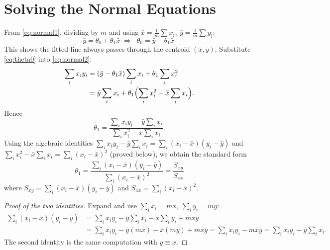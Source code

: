 \documentclass[11pt,a4paper]{report}
\theoremstyle{definition}
\theoremstyle{plain}
\theoremstyle{remark}
\newcommand{\xbar}{\bar{x}}
\newcommand{\ybar}{\bar{y}}
\begin{document}
	\section{Solving the Normal Equations}
	From \eqref{eq:normal1}, dividing by $m$ and using
	$\xbar=\frac1m\sum x_i,\ \ybar=\frac1m\sum y_i$:
	\begin{equation}
		\ybar=\theta_0+\theta_1\xbar
		\;\Longrightarrow\;
		\boxed{\;\theta_0=\ybar-\theta_1\xbar\;}
		\label{eq:theta0}
	\end{equation}
	This shows the fitted line always passes through the centroid
	$(\xbar,\ybar)$. Substitute \eqref{eq:theta0} into \eqref{eq:normal2}:
	\begin{align}
		\sum_i x_i y_i
		&=(\ybar-\theta_1\xbar)\sum_i x_i+\theta_1\sum_i x_i^2\\
		&=\ybar\sum_i x_i+\theta_1\Bigl(\sum_i x_i^2-\xbar\sum_i x_i\Bigr).
	\end{align}
	Hence
	\begin{equation}
		\theta_1=\frac{\sum_i x_i y_i-\ybar\sum_i x_i}
		{\sum_i x_i^2-\xbar\sum_i x_i}.
		\label{eq:theta1raw}
	\end{equation}
	Using the algebraic identities
	$\sum_i x_i y_i-\ybar\sum_i x_i=\sum_i(x_i-\xbar)(y_i-\ybar)$ and
	$\sum_i x_i^2-\xbar\sum_i x_i=\sum_i(x_i-\xbar)^2$ (proved below), we obtain the
	standard form
	\begin{equation}
		\boxed{\;\theta_1
			=\frac{\sum_i(x_i-\xbar)(y_i-\ybar)}{\sum_i(x_i-\xbar)^2}
			=\frac{S_{xy}}{S_{xx}}\;}
		\label{eq:theta1}
	\end{equation}
	where $S_{xy}=\sum_i(x_i-\xbar)(y_i-\ybar)$ and
	$S_{xx}=\sum_i(x_i-\xbar)^2$.
	
	\begin{proof}[Proof of the two identities]
		Expand and use $\sum_i x_i=m\xbar,\ \sum_i y_i=m\ybar$:
		\begin{align*}
			\sum_i(x_i-\xbar)(y_i-\ybar)
			&=\sum_i x_i y_i-\ybar\sum_i x_i-\xbar\sum_i y_i+m\xbar\ybar\\
			&=\sum_i x_i y_i-\ybar(m\xbar)-\xbar(m\ybar)+m\xbar\ybar
			=\sum_i x_i y_i-m\xbar\ybar
			=\sum_i x_i y_i-\ybar\sum_i x_i .
		\end{align*}
		The second identity is the same computation with $y\equiv x$. \qedhere
	\end{proof}
	
\end{document}
